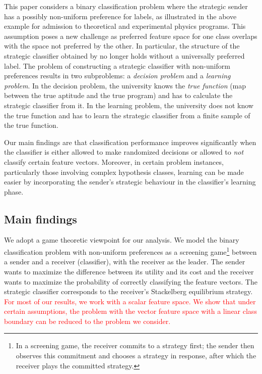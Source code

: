 This paper considers a binary classification problem where the strategic sender has a possibly non-uniform preference for labels, as illustrated in the above example for admission to theoretical and experimental physics programs. This assumption poses a new challenge as preferred feature space for one class overlaps with the space not preferred by the other. In particular, the structure of the strategic classifier obtained by \cite{hardt2016strategic} no longer holds without a universally preferred label.
The problem of constructing a strategic classifier with non-uniform preferences results in two subproblems: a \textit{decision problem} and a \textit{learning problem}. In the decision problem, the university knows the \textit{true function} (map between the true aptitude and the true program) and has to calculate the strategic classifier from it. In the learning problem, the university does not know the true function and has to learn the strategic classifier from a finite sample of the true function.

Our main findings are that classification performance improves significantly when the classifier is either allowed to make randomized decisions or allowed to \textit{not} classify certain feature vectors. Moreover, in certain problem instances, particularly those involving complex hypothesis classes, learning can be made easier by incorporating the sender's strategic behaviour in the classifier's learning phase.

\subsection{Main findings}

We adopt a game theoretic viewpoint for our analysis. We model the binary classification problem with non-uniform preferences as a screening game\footnote{In a screening game, the receiver commits to a strategy first; the sender then observes this commitment and chooses a strategy in response, after which the receiver plays the committed strategy.} between a sender and a receiver (classifier), with the receiver as the leader. The sender wants to maximize the difference between its utility and its cost and the receiver wants to maximize the probability of correctly classifying the feature vectors. The strategic classifier corresponds to the receiver's Stackelberg equilibrium strategy. \textcolor{red}{For most of our results, we work with a scalar feature space. We show that under certain assumptions, the problem with the vector feature space with a linear class boundary can be reduced to the problem we consider.} 

